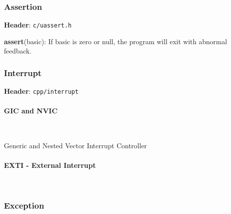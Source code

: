 

\subsubsection{Assertion}

\textbf{Header}: \verb|c/uassert.h|

\textbf{assert}(basic): If basic is zero or null, the program will exit with abnormal feedback.



\subsubsection{Interrupt}

\textbf{Header}: \verb|cpp/interrupt|



\paragraph{GIC and NVIC} \

Generic and Nested Vector Interrupt Controller



\paragraph{EXTI - External Interrupt} \



\subsubsection{Exception}

